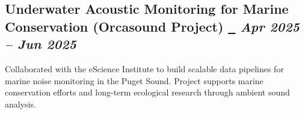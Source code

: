 \documentclass[10pt,a4paper]{article}
\begin{document}

\subsection{Underwater Acoustic Monitoring for Marine Conservation (Orcasound Project)%
\href{https://github.com/orcasound}{~\faExternalLink*} \hfill \textit{Apr 2025 -- Jun 2025}}
Collaborated with the eScience Institute to build scalable data pipelines for marine noise monitoring in the Puget Sound. Project supports marine conservation efforts and long-term ecological research through ambient sound analysis.


\end{document}
